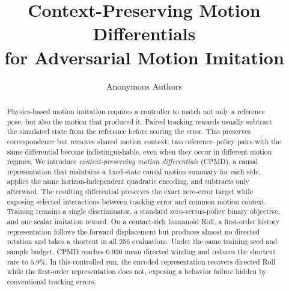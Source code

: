 \IEEEoverridecommandlockouts
\overrideIEEEmargins

\usepackage{amsmath,amssymb,amsfonts}
\usepackage{graphicx}
\usepackage{booktabs}
\usepackage{array}
\usepackage{microtype}
\usepackage{url}
\usepackage{cite}

\graphicspath{{figures/}}
\newcommand{\method}{CPMD}
\newcommand{\ours}{\textsc{CPMD}}
\newcommand{\R}{\mathbb{R}}
\newcommand{\Log}{\operatorname{Log}}
\newcommand{\softplus}{\operatorname{softplus}}
\newcommand{\triu}{\Pi_{<}}

\setlength{\dbltextfloatsep}{7pt plus 1pt minus 2pt}
\setlength{\textfloatsep}{7pt plus 1pt minus 2pt}
\setlength{\abovecaptionskip}{3pt}
\setlength{\belowcaptionskip}{0pt}

\title{Context-Preserving Motion Differentials\\
for Adversarial Motion Imitation}

\author{Anonymous Authors}


\maketitle
\thispagestyle{empty}
\pagestyle{empty}

\begin{abstract}
Physics-based motion imitation requires a controller to match not only a
reference pose, but also the motion that produced it.  Paired tracking rewards
usually subtract the simulated state from the reference before scoring the
error.  This preserves correspondence but removes shared motion context: two
reference--policy pairs with the same differential become indistinguishable,
even when they occur in different motion regimes.  We introduce
\emph{context-preserving motion differentials} (\method{}), a causal
representation that maintains a fixed-state causal motion summary for each
side, applies the same horizon-independent quadratic encoding, and subtracts
only afterward.  The resulting differential preserves the exact zero-error
target while exposing selected interactions between tracking error and common
motion context.
Training remains a single discriminator, a standard zero-versus-policy binary
objective, and one scalar imitation reward.  On a contact-rich humanoid Roll,
a first-order history representation follows the forward displacement but
produces almost no directed rotation and takes a shortcut in all 256
evaluations.  Under the same training seed and sample budget, \method{} reaches
$0.930$ mean directed winding and reduces the shortcut rate to $5.9\%$.
In this controlled run, the encoded representation recovers directed Roll
while the first-order representation does not, exposing a behavior failure
hidden by conventional tracking errors.
\end{abstract}

